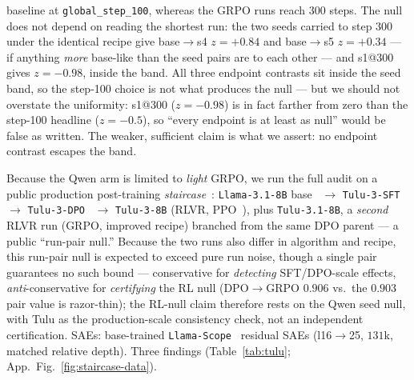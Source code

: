 \documentclass{article}
\begin{document}
baseline at \texttt{global\_step\_100}, whereas the GRPO runs reach $300$ steps. The null does not depend on reading the shortest run: the two seeds carried to step $300$ under the identical recipe give base$\to$s4 $z=+0.84$ and base$\to$s5 $z=+0.34$ --- if anything \emph{more} base-like than the seed pairs are to each other --- and s1@$300$ gives $z=-0.98$, inside the band. All three endpoint contrasts sit inside the seed band, so the step-100 choice is not what produces the null --- but we should not overstate the uniformity: s1@$300$ ($z=-0.98$) is in fact farther from zero than the step-100 headline ($z=-0.5$), so ``every endpoint is at least as null'' would be false as written. The weaker, sufficient claim is what we assert: no endpoint contrast escapes the band.

Because the Qwen arm is limited to \emph{light} GRPO, we run the full audit on a public production post-training \emph{staircase}~\citep{lambert2024tulu3}: \texttt{Llama-3.1-8B} base~\citep{grattafiori2024llama3} $\to$ \texttt{Tulu-3-SFT} $\to$ \texttt{Tulu-3-DPO}~\citep{rafailov2023dpo} $\to$ \texttt{Tulu-3-8B} (RLVR, PPO~\citep{schulman2017ppo}), plus \texttt{Tulu-3.1-8B}, a \emph{second} RLVR run (GRPO, improved recipe) branched from the same DPO parent --- a public ``run-pair null.'' Because the two runs also differ in algorithm and recipe, this run-pair null is expected to exceed pure run noise, though a single pair guarantees no such bound --- conservative for \emph{detecting} SFT/DPO-scale effects, \emph{anti}-conservative for \emph{certifying} the RL null (DPO$\to$GRPO $0.906$ vs.\ the $0.903$ pair value is razor-thin); the RL-null claim therefore rests on the Qwen seed null, with Tulu as the production-scale consistency check, not an independent certification. SAEs: base-trained \texttt{Llama-Scope}~\citep{he2024llamascope} residual SAEs (l16$\to$25, $131$k, matched relative depth). Three findings (Table~\ref{tab:tulu}; App.~Fig.~\ref{fig:staircase-data}).
\end{document}
